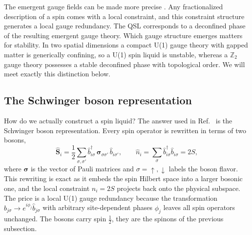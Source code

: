 \documentclass[11pt]{article}
\newcommand{\vS}{\boldsymbol{S}}
\begin{document}
The emergent gauge fields can be made more precise \cite{Savary2017}. Any
fractionalized description of a spin comes with a local constraint, and this
constraint structure generates a local gauge redundancy. The QSL corresponds to
a deconfined phase of the resulting emergent gauge theory. Which gauge
structure emerges matters for stability. In two spatial dimensions a compact
U(1) gauge theory with gapped matter is generically confining, so a U(1) spin
liquid is unstable, whereas a $\mathbb{Z}_2$ gauge theory possesses a stable
deconfined phase with topological order. We will meet exactly this distinction
below.

\subsection{The Schwinger boson representation}
\label{sec:sb}

How do we actually construct a spin liquid? The answer used in
Ref.~\cite{Sobral2025} is the Schwinger boson representation.
Every spin operator is rewritten in terms of two bosons,
\begin{equation}
    \label{eq:sbrep}
    \hat{\vS}_i = \frac{1}{2} \sum_{\sigma,\sigma'}
    \hat{b}^\dagger_{i\sigma}\, \boldsymbol{\sigma}_{\sigma\sigma'}\,
    \hat{b}_{i\sigma'},
    \qquad
    \hat{n}_i = \sum_{\sigma} \hat{b}^\dagger_{i\sigma} \hat{b}_{i\sigma} = 2S,
\end{equation}
where $\boldsymbol{\sigma}$ is the vector of Pauli matrices and $\sigma =
\uparrow, \downarrow$ labels the boson flavor. This rewriting is exact as it
embeds the spin Hilbert space into a larger bosonic one, and the local
constraint $\hat{n}_i = 2S$ projects back onto the physical subspace. The price
is a local U(1) gauge redundancy because the transformation $\hat{b}_{j\sigma} \to
e^{i\phi_j} \hat{b}_{j\sigma}$ with arbitrary site-dependent phases $\phi_j$
leaves all spin operators unchanged. The bosons carry spin $\tfrac{1}{2}$, they
are the spinons of the previous subsection.
\end{document}
